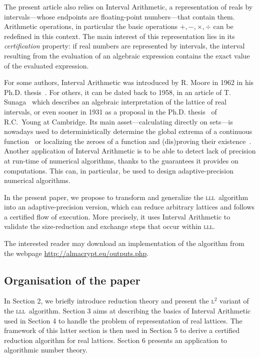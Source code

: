 \documentclass{amsart}
\newcommand{\LL}{\mbox{\textsc{l}$^2$}\xspace}
\newcommand{\LLL}{\mbox{\textsc{lll}}}
\theoremstyle{definition}
\begin{document}
The present article also relies on Interval Arithmetic, a
representation of reals by intervals---whose endpoints are
floating-point numbers---that contain them.  Arithmetic operations, in
particular the basic operations $+, -, \times , \div$ can be redefined
in this context.  The main interest of this representation lies in its
\emph{certification} property: if real numbers are represented by
intervals, the interval resulting from the evaluation of an algebraic
expression contains the exact value of the evaluated
expression.\medskip

For some authors, Interval Arithmetic was introduced by
R. Moore in 1962 in his Ph.D. thesis~\cite{Moore62}. For others, it can
be dated back to 1958, in an article of T. Sunaga~\cite{Sunaga58} which
describes an algebraic interpretation of the lattice of real intervals,
or even sooner in 1931 as a proposal in the Ph.D. thesis~\cite{Young31}
of R.C.~Young at Cambridge.
Its main
asset---calculating
directly on sets---is nowadays used to deterministically determine
the global extrema of a continuous function~\cite{Ratschek} or
localizing the zeroes of a function and (dis)proving their
existence~\cite{jaulin2001}. Another application of Interval Arithmetic
is to be able to detect lack of precision at run-time of numerical
algorithms, thanks to the guarantees it provides on computations.
This can, in particular, be used to design adaptive-precision
numerical algorithms.
 \medskip

In the present paper, we propose to transform and generalize
the \LLL~algorithm into an adaptive-precision version, which can reduce
arbitrary lattices and follows a certified flow of execution. More
precisely, it uses Interval Arithmetic to validate the size-reduction
and exchange steps that occur within \LLL.

The interested reader may download an implementation of the algorithm
from the webpage \url{http://almacrypt.eu/outputs.php}.

\subsection*{Organisation of the paper}
In Section 2, we briefly introduce reduction theory and present the \LL
variant of the \LLL~algorithm.  Section 3 aims at describing the basics
of Interval Arithmetic used in Section 4 to handle the problem of
representation of real lattices.  The framework of this latter section
is then used in Section 5 to derive a certified reduction algorithm for
real lattices. Section 6 presents an application to
algorithmic number theory.
\end{document}

